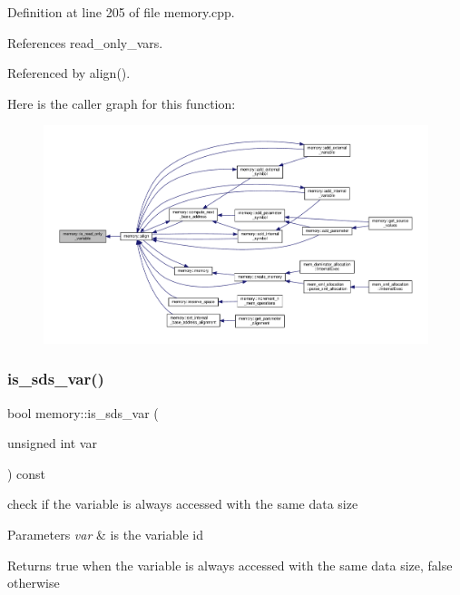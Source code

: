 Definition at line 205 of file memory.\+cpp.



References read\+\_\+only\+\_\+vars.



Referenced by align().

Here is the caller graph for this function\+:
\nopagebreak
\begin{figure}[H]
\begin{center}
\leavevmode
\includegraphics[width=350pt]{d8/d99/classmemory_a95592389e09c170738164d64ef46aacb_icgraph}
\end{center}
\end{figure}
\mbox{\label{classmemory_aa55b7b58d5ccf69ab5f8a79207750079}} 
\subsubsection{\texorpdfstring{is\+\_\+sds\+\_\+var()}{is\_sds\_var()}}
{\footnotesize\ttfamily bool memory\+::is\+\_\+sds\+\_\+var (\begin{DoxyParamCaption}\item[{unsigned int}]{var }\end{DoxyParamCaption}) const}



check if the variable is always accessed with the same data size 


\begin{DoxyParams}{Parameters}
{\em var} & is the variable id \\
\hline
\end{DoxyParams}
\begin{DoxyReturn}{Returns}
true when the variable is always accessed with the same data size, false otherwise 
\end{DoxyReturn}


